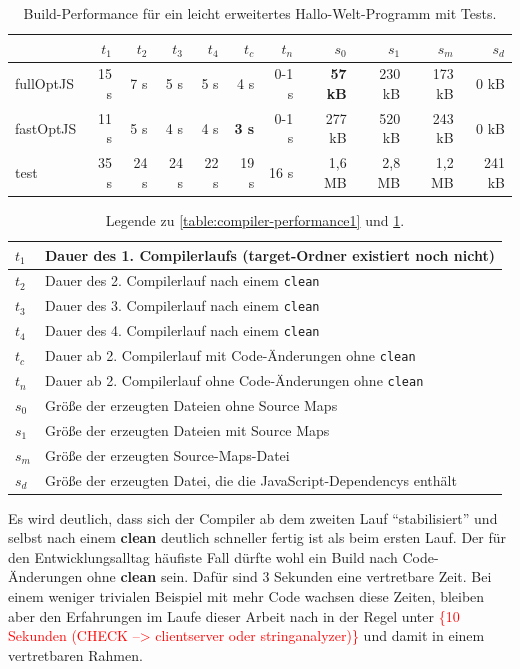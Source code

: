 \documentclass[a4paper, 12pt, hidelinks, listof=totoc, listoftables=totoc, bibliography=totoc]{scrreprt}
\newcommand{\code}[1]{\lstinline[language=Scala, style=inline]|#1|}
\newcommand{\TODOi}[1]{\textcolor{red}{\{#1\}}}
\begin{document}
\begin{table}[!h]
\begin{tabular}{|l|r|r|r|r|r|r||r|r|r|r|}
\hline           & $t_1$ & $t_2$ & $t_3$ & $t_4$ & $t_c$         & $t_n$ & $s_0$          & $s_1$  & $s_m$  & $s_d$ \\ 
\hline fullOptJS & 15 s  &  7 s  &  5 s  &  5 s  &          4 s  & 0-1 s & \textbf{57 kB} & 230 kB & 173 kB &   0 kB \\ 
\hline fastOptJS & 11 s  &  5 s  &  4 s  &  4 s  &  \textbf{3 s} & 0-1 s &        277 kB  & 520 kB & 243 kB &   0 kB \\ 
\hline test      & 35 s  & 24 s  & 24 s  & 22 s  &         19 s  &  16 s &        1,6 MB  & 2,8 MB & 1,2 MB & 241 kB \\ 
\hline 
\end{tabular} 
\caption{Build-Performance für ein leicht erweitertes Hallo-Welt-Programm mit Tests.}
\label{table:compiler-performance2}
\end{table}

\begin{table}[!h]
\begin{tabular}{|l|l|}
\hline $t_1$ & Dauer des 1. Compilerlaufs (target-Ordner existiert noch nicht) \\ 
\hline $t_2$ & Dauer des 2. Compilerlauf nach einem \code{clean} \\ 
\hline $t_3$ & Dauer des 3. Compilerlauf nach einem \code{clean} \\ 
\hline $t_4$ & Dauer des 4. Compilerlauf nach einem \code{clean} \\ 
\hline $t_c$ & Dauer ab 2. Compilerlauf mit Code-Änderungen ohne \code{clean} \\ 
\hline $t_n$ & Dauer ab 2. Compilerlauf ohne Code-Änderungen ohne \code{clean} \\ 
\hline $s_0$ & Größe der erzeugten Dateien ohne Source Maps \\ 
\hline $s_1$ & Größe der erzeugten Dateien mit Source Maps \\ 
\hline $s_m$ & Größe der erzeugten Source-Maps-Datei \\ 
\hline $s_d$ & Größe der erzeugten Datei, die die JavaScript-Dependencys enthält \\ 
\hline 
\end{tabular} 
\caption{Legende zu \ref{table:compiler-performance1} und \ref{table:compiler-performance2}.}
\label{table:compiler-performance-legend}
\end{table}

Es wird deutlich, dass sich der Compiler ab dem zweiten Lauf "`stabilisiert"' und selbst nach einem \textbf{clean} deutlich schneller fertig ist als beim ersten Lauf. Der für den Entwicklungsalltag häufiste Fall dürfte wohl ein Build nach Code-Änderungen ohne \textbf{clean} sein. Dafür sind 3 Sekunden eine vertretbare Zeit. Bei einem weniger trivialen Beispiel mit mehr Code wachsen diese Zeiten, bleiben aber den Erfahrungen im Laufe dieser Arbeit nach in der Regel unter \TODOi{10 Sekunden (CHECK --> clientserver oder stringanalyzer)} und damit in einem vertretbaren Rahmen.
\end{document}
